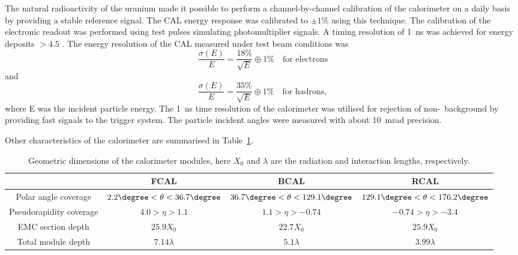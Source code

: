 The natural radioactivity of the uranium made it possible to perform a channel-by-channel calibration of the calorimeter on a daily basis by providing a stable reference signal. The CAL energy response was calibrated to $\pm 1\%$ using this technique. The calibration of the electronic readout was performed using test pulses simulating photomultiplier signals. A timing resolution of 1~ns was achieved for energy deposits $> 4.5$ \GeV.
The energy resolution of the CAL measured under test beam conditions was 
\begin{equation}
	\frac{\sigma \left(E\right)}{E} = \frac{18\%}{\sqrt{E}} \oplus 1\% \quad \text{for electrons}
\end{equation}
and 
\begin{equation}
	\frac{\sigma \left(E\right)}{E} = \frac{35\%}{\sqrt{E}} \oplus 1\% \quad \text{for hadrons},
\end{equation}
where E was the incident particle energy. The 1~ns time resolution of the calorimeter was utilised for rejection of non-\ep~background by providing fast signals to the trigger system. The particle incident angles were measured with about 10~mrad precision.

Other characteristics of the \zeus calorimeter are summarised in Table~\ref{tab:calparams}.

\begin{table}[htbp]
	\centering
	{\small
		\begin{tabular}{|c|c|c|c|}
			     \hline
      &FCAL & BCAL & RCAL \\
			\hline
			\hline
			Polar angle coverage & $2.2\degree < \theta < 36.7\degree$ & $36.7\degree < \theta < 129.1\degree$ & $129.1\degree < \theta < 176.2\degree$ \\ \hline
			Pseudorapidity coverage & $4.0 > \eta > 1.1$ & $1.1 > \eta > -0.74$ & $-0.74 > \eta > -3.4$ \\ \hline
			EMC section depth & $25.9 X_0$ & $22.7 X_0$ & $25.9 X_0$ \\ \hline
			Total module depth & $7.14 \lambda$ & $5.1 \lambda$ & $3.99 \lambda$ \\ \hline		
		\end{tabular}
	}
	\caption{Geometric dimensions of the calorimeter modules, here $X_0$ and $\lambda$ are the radiation and interaction lengths, respectively.}
	\label{tab:calparams}
\end{table}

